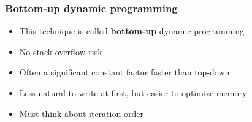 \documentclass[t]{beamer}
\begin{document}
\begin{frame}

    \frametitle{Bottom-up dynamic programming}

    \begin{itemize}

        \item

        This technique is called \textbf{bottom-up} dynamic programming

        \pause

        \item

        No stack overflow risk

        \pause

        \item

        Often a significant constant factor faster than top-down

        \pause

        \item

        Less natural to write at first, but easier to optimize memory

        \pause

        \item

        Must think about iteration order

    \end{itemize}

\end{frame}
\end{document}
